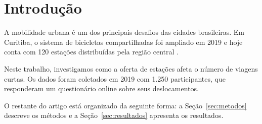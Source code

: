 \section{Introdução}
\label{sec:intro}

A mobilidade urbana é um dos principais desafios das cidades brasileiras. Em Curitiba, o sistema de bicicletas compartilhadas foi ampliado em 2019 e hoje conta com 120 estações distribuídas pela região central \cite{prefeitura2021}.

Neste trabalho, investigamos como a oferta de estações afeta o número de viagens curtas. Os dados foram coletados em 2019 com 1.250 participantes, que responderam um questionário online sobre seus deslocamentos.

O restante do artigo está organizado da seguinte forma: a Seção~\ref{sec:metodos} descreve os métodos e a Seção~\ref{sec:resultados} apresenta os resultados.
